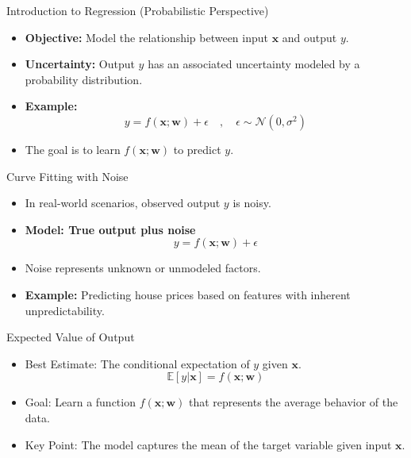 \documentclass[serif, aspectratio=169]{beamer}
\begin{document}

\begin{frame}{Introduction to Regression (Probabilistic Perspective)}
    \begin{itemize}
        \item \textbf{Objective:} Model the relationship between input \( \mathbf{x} \) and output \( y \).
        \item \textbf{Uncertainty:} Output \( y \) has an associated uncertainty modeled by a probability distribution.
        \item \textbf{Example:}
        \[
        y = f(\mathbf{x}; \mathbf{w}) + \epsilon \quad , \quad \epsilon \sim \mathcal{N}(0, \sigma^2)
        \]
        \item The goal is to learn \( f(\mathbf{x}; \mathbf{w}) \) to predict \( y \).
    \end{itemize}
\end{frame}

\begin{frame}{Curve Fitting with Noise}
    \begin{itemize}
        \item In real-world scenarios, observed output \( y \) is noisy.
        \item \textbf{Model: True output plus noise}
        \[
        y = f(\mathbf{x}; \mathbf{w}) + \epsilon
        \]
        \item Noise represents unknown or unmodeled factors.
        \item \textbf{Example:} Predicting house prices based on features with inherent unpredictability.
    \end{itemize}
\end{frame}

\begin{frame}{Expected Value of Output}
    \begin{itemize}
        \item Best Estimate: The conditional expectation of \( y \) given \( \mathbf{x} \).
        \[
        \mathbb{E}[y | \mathbf{x}] = f(\mathbf{x}; \mathbf{w})
        \]
        \item Goal: Learn a function \( f(\mathbf{x}; \mathbf{w}) \) that represents the average behavior of the data.
        \item Key Point: The model captures the mean of the target variable given input \( \mathbf{x} \).
    \end{itemize}
\end{frame}
\end{document}
